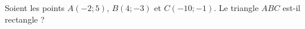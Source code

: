 %
%
    Soient les points \(A(-2;5)\), \(B(4;-3)\) et \(C(-10;-1)\). Le triangle \(ABC\) est-il rectangle ?
